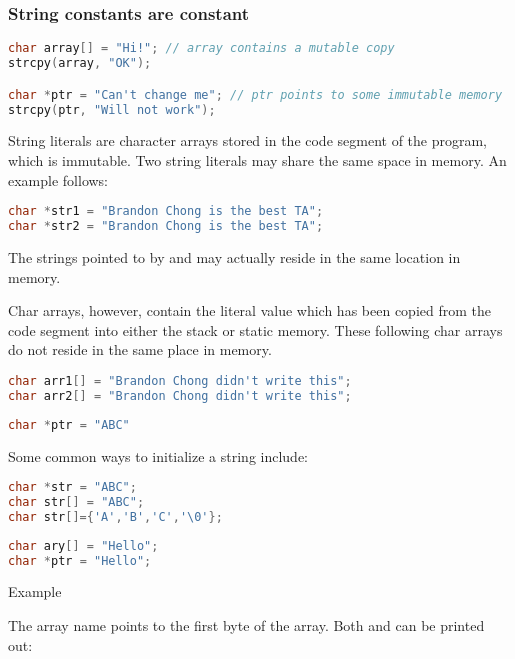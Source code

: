 \subsubsection{String constants are constant}

\begin{lstlisting}[language=C]
char array[] = "Hi!"; // array contains a mutable copy 
strcpy(array, "OK");

char *ptr = "Can't change me"; // ptr points to some immutable memory
strcpy(ptr, "Will not work");
\end{lstlisting}

String literals are character arrays stored in the code segment of the program, which is immutable. Two string literals may share the same space in memory. An example follows:

\begin{lstlisting}[language=C]
char *str1 = "Brandon Chong is the best TA";
char *str2 = "Brandon Chong is the best TA";
\end{lstlisting}

The strings pointed to by  and  may actually reside in the same location in memory.

Char arrays, however, contain the literal value which has been copied from the code segment into either the stack or static memory. These following char arrays do not reside in the same place in memory.

\begin{lstlisting}[language=C]
char arr1[] = "Brandon Chong didn't write this";
char arr2[] = "Brandon Chong didn't write this";
\end{lstlisting}

\begin{lstlisting}[language=C]
char *ptr = "ABC"
\end{lstlisting}

Some common ways to initialize a string include:

\begin{lstlisting}[language=C]
char *str = "ABC";
char str[] = "ABC";
char str[]={'A','B','C','\0'};
\end{lstlisting}

\begin{lstlisting}[language=C]
char ary[] = "Hello";
char *ptr = "Hello";
\end{lstlisting}

Example

The array name points to the first byte of the array. Both 
and  can be printed out:

